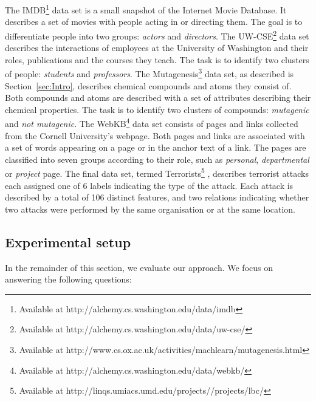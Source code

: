 The IMDB\footnote{Available at http://alchemy.cs.washington.edu/data/imdb} data set is a small snapshot of the Internet Movie Database.
It describes a set of movies with people acting in or directing them.
The goal is to differentiate people into two groups: \textit{actors} and \textit{directors}.
The UW-CSE\footnote{Available at http://alchemy.cs.washington.edu/data/uw-cse/} data set describes the interactions of employees at the University of Washington and their roles, publications and the courses they teach.
The task is to identify two clusters of people: \textit{students} and \textit{professors}.
The Mutagenesis\footnote{Available at http://www.cs.ox.ac.uk/activities/machlearn/mutagenesis.html} data set, as described is Section~\ref{sec:Intro}, describes chemical compounds and atoms they consist of.
Both compounds and atoms are described with a set of attributes describing their chemical properties.
The task is to identify two clusters of compounds: \textit{mutagenic} and \textit{not mutagenic}.
The WebKB\footnote{Available at http://alchemy.cs.washington.edu/data/webkb/} data set consists of pages and links collected from the Cornell University's webpage.
Both pages and links are associated with a set of words appearing on a page or in the anchor text of a link.
The pages are classified into seven groups according to their role, such as \textit{personal}, \textit{departmental} or \textit{project} page.
The final data set, termed Terrorists\footnote{Available at http://linqs.umiacs.umd.edu/projects//projects/lbc/} \cite{sen:aimag08}, describes terrorist attacks each assigned one of 6 labels indicating the type of the attack.
Each attack is described by a total of 106 distinct features, and two relations indicating whether two attacks were performed by the same organisation or at the same location.



\subsection{Experimental setup}

In the remainder of this section, we evaluate our approach.
We focus on answering the following questions:

